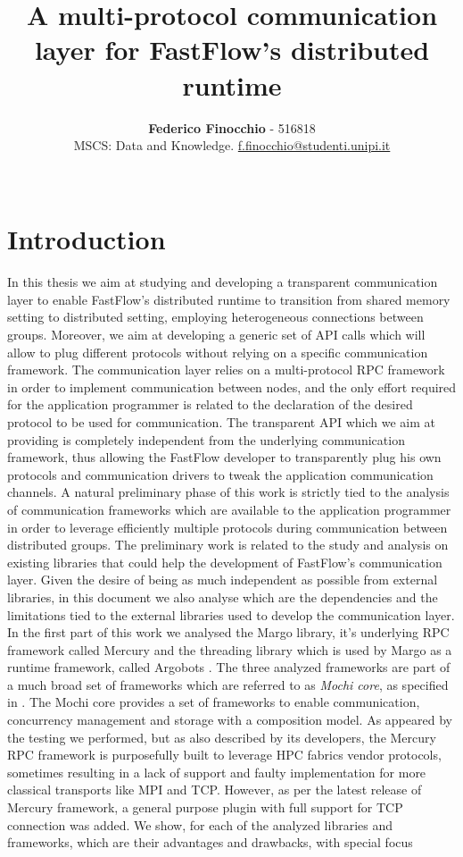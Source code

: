\documentclass[12pt]{article}
\title{\vspace{-2cm}\textbf{A multi-protocol communication layer for FastFlow's distributed runtime}}
\author{
    \normalsize{\textbf{Federico Finocchio} - 516818}\\
    \normalsize{MSCS: Data and Knowledge. \underline{f.finocchio@studenti.unipi.it}}\\\\
}
\makeatletter
\renewenvironment{abstract}{%
    \if@twocolumn
      \section*{\abstractname}%
    \else %
      \begin{center}%
        {\bfseries \normalsize\abstractname\vspace{\z@}}%
      \end{center}%
      \quotation
    \fi}
    {\if@twocolumn\else\endquotation\fi}
\makeatother
\begin{document}
\date{}
\maketitle
    
\tableofcontents
\newpage
\sloppy
\section*{Introduction}
\label{introduction}
In this thesis we aim at studying and developing a transparent communication layer to enable FastFlow's distributed runtime to transition from shared memory setting to distributed setting, employing heterogeneous connections between groups. Moreover, we aim at developing a generic set of API calls which will allow to plug different protocols without relying on a specific communication framework. The communication layer relies on a multi-protocol RPC framework in order to implement communication between nodes, and the only effort required for the application programmer is related to the declaration of the desired protocol to be used for communication. The transparent API which we aim at providing is completely independent from the underlying communication framework, thus allowing the FastFlow developer to transparently plug his own protocols and communication drivers to tweak the application communication channels. A natural preliminary phase of this work is strictly tied to the analysis of communication frameworks which are available to the application programmer in order to leverage efficiently multiple protocols during communication between distributed groups. The preliminary work is related to the study and analysis on existing libraries that could help the development of FastFlow's communication layer. Given the desire of being as much independent as possible from external libraries, in this document we also analyse which are the dependencies and the limitations tied to the external libraries used to develop the communication layer. In the first part of this work we analysed the Margo \cite{mochi-core} library, it's underlying RPC framework called Mercury \cite{mochi-core, mercury} and the threading library which is used by Margo as a runtime framework, called Argobots \cite{argobots-paper}. The three analyzed frameworks are part of a much broad set of frameworks which are referred to as \textit{Mochi core}, as specified in \cite{mochi-core}.  The Mochi core provides a set of frameworks to enable communication, concurrency management and storage with a composition model. As appeared by the testing we performed, but as also described by its developers, the Mercury RPC framework is purposefully built to leverage HPC fabrics vendor protocols, sometimes resulting in a lack of support and faulty implementation for more classical transports like MPI and TCP. However, as per the latest release of Mercury framework, a general purpose plugin with full support for TCP connection was added. We show, for each of the analyzed libraries and frameworks, which are their advantages and drawbacks, with special focus 
\end{document}
